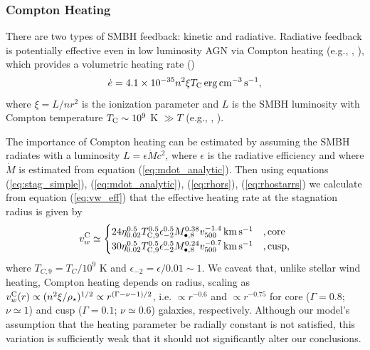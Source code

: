 \documentclass[usenatbib,fleqn]{mn2e}
\newcommand{\densSlope}{\nu}
\begin{document}
\subsubsection{Compton Heating}

There are two types of SMBH feedback: kinetic and radiative.
Radiative feedback is potentially effective even in low luminosity AGN
via Compton heating (e.g., \citealt{Sazonov+04}, \citealt{Ciotti+10}),
which provides a volumetric heating rate (\citealt{Gan+14})
\begin{align}
\dot{e} = 4.1\times 10^{-35}n^{2}\xi T_{\rm C}\,{\rm erg\,cm^{-3}\,s^{-1}},
\end{align}
where $\xi = L/n r^{2}$ is the ionization parameter and $L$ is the SMBH luminosity with Compton temperature $T_{\rm C} \sim 10^{9}$ K $\gg T$ (e.g., \citealt{Ho99}, \citealt{Eracleous+10}).  

The importance of Compton heating can be estimated by assuming the
SMBH radiates with a luminosity $L = \epsilon \dot{M}c^{2}$, where
$\epsilon$ is the radiative efficiency and where $\dot{M}$ is
estimated from equation (\ref{eq:mdot_analytic}).  Then using
equations (\ref{eq:stag_simple}), (\ref{eq:mdot_analytic}),
(\ref{eq:rhors}), (\ref{eq:rhostarrs}) we calculate from equation
(\ref{eq:vw_eff}) that the effective heating rate at the stagnation
radius is given by
\begin{align} v_{w}^{\rm C} \simeq
  \begin{cases} 24 \eta_{0.02}^{0.5}T_{\rm
C,9}^{0.5}\epsilon_{-2}^{0.5} M_{\bullet,8}^{0.38}v_{500}^{-1.4}\,{\rm
km\,s^{-1}} &, \text{core}\\ 30 \eta_{0.02}^{0.5}T_{\rm
C,9}^{0.5}\epsilon_{-2}^{0.5} M_{\bullet,8}^{0.24}v_{500}^{-0.7}\,{\rm
km\,s^{-1}} &, \text{cusp},
  \end{cases}
  \label{eq:vC}
\end{align} where $T_{C,9} = T_{C}/10^{9}$ K and $\epsilon_{-2} =
\epsilon/0.01 \sim 1$.  We caveat that, unlike stellar wind heating,
Compton heating depends on radius, scaling as $v_{w}^{\rm C}(r)
\propto (n^{2}\xi/\rho_{\star})^{1/2} \propto
r^{(\Gamma-\densSlope-1)/2}$, i.e. $\propto r^{-0.6}$ and $\propto
r^{-0.75}$ for core ($\Gamma = 0.8$; $\densSlope \simeq 1$) and cusp
($\Gamma = 0.1$; $\densSlope \simeq 0.6$) galaxies, respectively.
Although our model's assumption that the heating parameter be radially
constant is not satisfied, this variation is sufficiently weak that it
should not significantly alter our conclusions.
\end{document}
